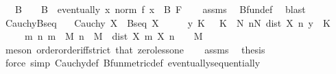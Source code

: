 \begin{isabellebody}
\ \ \ B\ \ {\isachardoublequoteopen}{}\ {\isacharless}{\kern0pt}\ B{\isachardoublequoteclose}\ \ {\isachardoublequoteopen}eventually\ {\isacharparenleft}{\kern0pt}{\isasymlambda}x{\isachardot}{\kern0pt}\ norm\ {\isacharparenleft}{\kern0pt}f\ x{\isacharparenright}{\kern0pt}\ {\isasymle}\ B{\isacharparenright}{\kern0pt}\ F{\isachardoublequoteclose}\isanewline
%
\isadelimproof
\ \ %
\endisadelimproof
%
\isatagproof
{}\isamarkupfalse%
\ assms\ \isamarkupfalse%
\ Bfun{\isacharunderscore}{\kern0pt}def\ \isamarkupfalse%
\ blast%
\endisatagproof
{\isafoldproof}%
%
\isadelimproof
\isanewline
%
\endisadelimproof
\isanewline
{}\isamarkupfalse%
\ Cauchy{\isacharunderscore}{\kern0pt}Bseq{\isacharcolon}{\kern0pt}\isanewline
\ \ \ {\isachardoublequoteopen}Cauchy\ X{\isachardoublequoteclose}\ \ {\isachardoublequoteopen}Bseq\ X{\isachardoublequoteclose}\isanewline
%
\isadelimproof
%
\endisadelimproof
%
\isatagproof
{}\isamarkupfalse%
\ {\isacharminus}{\kern0pt}\isanewline
\ \ \isamarkupfalse%
\ {\isachardoublequoteopen}{\isasymexists}y\ K{\isachardot}{\kern0pt}\ {}\ {\isacharless}{\kern0pt}\ K\ {\isasymand}\ {\isacharparenleft}{\kern0pt}{\isasymexists}N{\isachardot}{\kern0pt}\ {\isasymforall}n{\isasymge}N{\isachardot}{\kern0pt}\ dist\ {\isacharparenleft}{\kern0pt}X\ n{\isacharparenright}{\kern0pt}\ y\ {\isasymle}\ K{\isacharparenright}{\kern0pt}{\isachardoublequoteclose}\isanewline
\ \ \ \ \ {\isachardoublequoteopen}{\isasymAnd}m\ n{\isachardot}{\kern0pt}\ {\isasymlbrakk}m\ {\isasymge}\ M{\isacharsemicolon}{\kern0pt}\ n\ {\isasymge}\ M{\isasymrbrakk}\ {\isasymLongrightarrow}\ dist\ {\isacharparenleft}{\kern0pt}X\ m{\isacharparenright}{\kern0pt}\ {\isacharparenleft}{\kern0pt}X\ n{\isacharparenright}{\kern0pt}\ {\isacharless}{\kern0pt}\ {}{\isachardoublequoteclose}\ \ M\isanewline
\ \ \ \ \isamarkupfalse%
\ {\isacharparenleft}{\kern0pt}meson\ order{\isachardot}{\kern0pt}order{\isacharunderscore}{\kern0pt}iff{\isacharunderscore}{\kern0pt}strict\ that\ zero{\isacharunderscore}{\kern0pt}less{\isacharunderscore}{\kern0pt}one{\isacharparenright}{\kern0pt}\isanewline
\ \ \isamarkupfalse%
\ assms\ \isamarkupfalse%
\ {\isacharquery}{\kern0pt}thesis\isanewline
\ \ \ \ \isamarkupfalse%
\ {\isacharparenleft}{\kern0pt}force\ simp{\isacharcolon}{\kern0pt}\ Cauchy{\isacharunderscore}{\kern0pt}def\ Bfun{\isacharunderscore}{\kern0pt}metric{\isacharunderscore}{\kern0pt}def\ eventually{\isacharunderscore}{\kern0pt}sequentially{\isacharparenright}{\kern0pt}\isanewline

\end{isabellebody}
